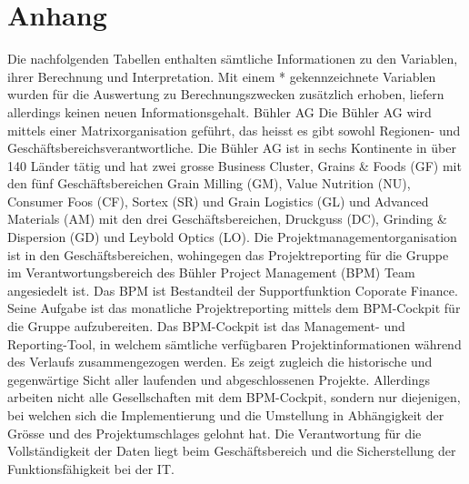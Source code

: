 \section*{Anhang}
\label{sec:annex}
Die nachfolgenden Tabellen enthalten sämtliche Informationen zu den Variablen, ihrer Berechnung und Interpretation. Mit einem * gekennzeichnete Variablen wurden für die Auswertung zu Berechnungszwecken zusätzlich erhoben, liefern allerdings keinen neuen Informationsgehalt. 
Bühler AG
Die Bühler AG wird mittels einer Matrixorganisation geführt, das heisst es gibt sowohl Regionen- und Geschäftsbereichsverantwortliche. Die Bühler AG ist in sechs Kontinente in über 140 Länder tätig und hat zwei grosse Business Cluster, Grains \& Foods (GF) mit den fünf Geschäftsbereichen Grain Milling (GM), Value Nutrition (NU), Consumer Foos (CF), Sortex (SR) und Grain Logistics (GL) und Advanced Materials (AM) mit den drei Geschäftsbereichen, Druckguss (DC), Grinding \& Dispersion (GD) und Leybold Optics (LO). Die Projektmanagementorganisation ist in den Geschäftsbereichen, wohingegen das Projektreporting für die Gruppe im Verantwortungsbereich des Bühler Project Management (BPM) Team angesiedelt ist. Das BPM ist Bestandteil der Supportfunktion Coporate Finance. Seine Aufgabe ist das monatliche Projektreporting mittels dem BPM-Cockpit für die Gruppe aufzubereiten. Das BPM-Cockpit ist das Management- und Reporting-Tool, in welchem sämtliche verfügbaren Projektinformationen während des Verlaufs zusammengezogen werden. Es zeigt zugleich die historische und gegenwärtige Sicht aller laufenden und abgeschlossenen Projekte. Allerdings arbeiten nicht alle Gesellschaften mit dem BPM-Cockpit, sondern nur diejenigen, bei welchen sich die Implementierung und die Umstellung in Abhängigkeit der Grösse und des Projektumschlages gelohnt hat. Die Verantwortung für die Vollständigkeit der Daten liegt beim Geschäftsbereich und die Sicherstellung der Funktionsfähigkeit bei der IT.
